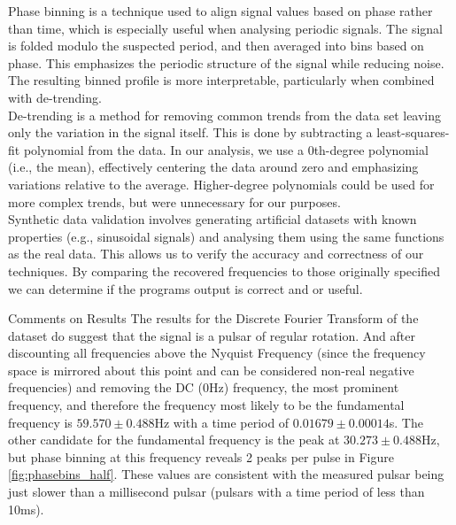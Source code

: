 \documentclass[reqno]{amsart}
\makeatletter
\renewcommand\subsection{\@startsection{subsection}{2}%
  \z@{.5\linespacing\@plus.7\linespacing}{-.5em}%
  {\normalfont\scshape\justify}}
\numberwithin{equation}{section}
\numberwithin{figure}{section}
\makeatother
\begin{document}
Phase binning is a technique used to align signal values based on phase rather than time, which is especially useful when analysing periodic signals. The signal is folded modulo the suspected period, and then averaged into bins based on phase. This emphasizes the periodic structure of the signal while reducing noise. The resulting binned profile is more interpretable, particularly when combined with de-trending. \\

De-trending is a method for removing common trends from the data set leaving only the variation in the signal itself. This is done by subtracting a least-squares-fit polynomial from the data. In our analysis, we use a 0th-degree polynomial (i.e., the mean), effectively centering the data around zero and emphasizing variations relative to the average. Higher-degree polynomials could be used for more complex trends, but were unnecessary for our purposes. \\

Synthetic data validation involves generating artificial datasets with known properties (e.g., sinusoidal signals) and analysing them using the same functions as the real data. This allows us to verify the accuracy and correctness of our techniques. By comparing the recovered frequencies to those originally specified we can determine if the programs output is correct and or useful.

\subsection{Comments on Results}
The results for the Discrete Fourier Transform of the dataset do suggest that the signal is a pulsar of regular rotation. And after discounting all frequencies above the Nyquist Frequency (since the frequency space is mirrored about this point and can be considered non-real negative frequencies) and removing the DC (0Hz) frequency, the most prominent frequency, and therefore the frequency most likely to be the fundamental frequency is $59.570 \pm 0.488$Hz with a time period of $0.01679 \pm 0.00014$s. The other candidate for the fundamental frequency is the peak at $30.273 \pm 0.488$Hz, but phase binning at this frequency reveals 2 peaks per pulse in Figure \ref{fig:phasebins_half}. These values are consistent with the measured pulsar being just slower than a millisecond pulsar (pulsars with a time period of less than 10ms). \\
\end{document}
